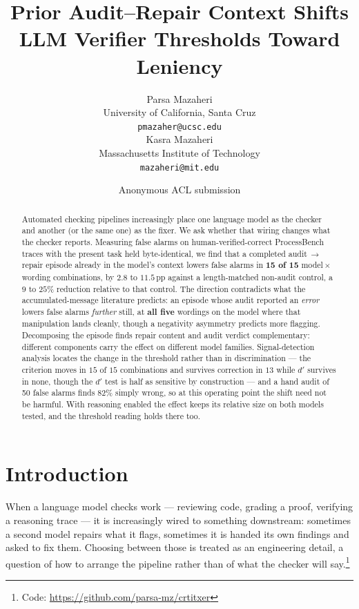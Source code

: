\documentclass[11pt]{article}
\title{Prior Audit--Repair Context Shifts LLM Verifier Thresholds Toward Leniency}
\author{Parsa Mazaheri \\
    University of California, Santa Cruz \\
    \texttt{pmazaher@ucsc.edu} \\\And
    Kasra Mazaheri \\
    Massachusetts Institute of Technology \\
    \texttt{mazaheri@mit.edu}}
\author{Anonymous ACL submission}
\newcommand{\pp}{\,\text{pp}}
\newcommand{\codenote}{\footnote{Code: \url{https://github.com/parsa-mz/crtitxer}}}
\newcommand{\codenote}{\footnote{Code and all artefacts accompany this submission as
    supplementary material.}}
\begin{document}
\maketitle

\begin{abstract}
Automated checking pipelines increasingly place one language model as the checker and another (or
the same one) as the fixer. We ask whether that wiring changes what the checker reports. Measuring
false alarms on human-verified-correct ProcessBench traces with the present task held byte-identical,
we find that a completed audit\,$\to$\,repair episode already in the model's context lowers false
alarms in \textbf{15 of 15} model\,$\times$\,wording combinations, by $2.8$ to $11.5\pp$ against a
length-matched non-audit control, a $9$ to $25\%$ reduction relative to that control. The direction contradicts
what the accumulated-message literature predicts: an episode whose audit reported an \emph{error}
lowers false alarms \emph{further} still, at \textbf{all five} wordings on the model where that
manipulation lands cleanly, though a negativity asymmetry predicts more flagging. Decomposing the
episode finds repair content and audit verdict complementary: different components carry the effect on
different model families. Signal-detection analysis locates the change in the threshold rather than in
discrimination --- the criterion moves in $15$ of $15$ combinations and survives correction in $13$
while $d'$ survives in none, though the $d'$ test is half as sensitive by construction --- and a hand audit of 50 false alarms finds 82\% simply
wrong, so at this operating point the shift need not be harmful. With reasoning
enabled the effect keeps its relative size on both models tested, and the threshold reading holds
there too.
\end{abstract}

\section{Introduction}
\label{sec:intro}

When a language model checks work --- reviewing code, grading a proof, verifying a reasoning trace
--- it is increasingly wired to something downstream: sometimes a second model repairs what it flags,
sometimes it is handed its own findings and asked to fix them. Choosing between those is treated as an
engineering detail, a question of how to arrange the pipeline rather than of what the checker will
say.\codenote
\end{document}
